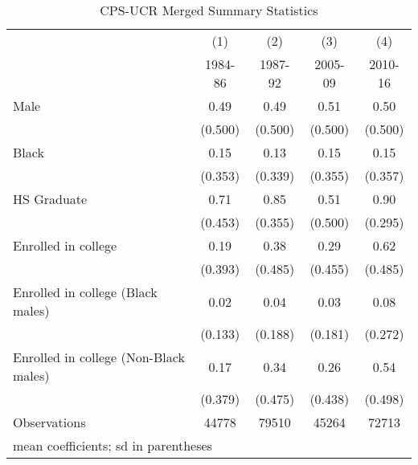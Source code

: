 \begin{table}[htbp]\centering
\caption{CPS-UCR Merged Summary Statistics}
\begin{tabular}{l*{4}{c}}
\hline\hline
                    &\multicolumn{1}{c}{(1)}&\multicolumn{1}{c}{(2)}&\multicolumn{1}{c}{(3)}&\multicolumn{1}{c}{(4)}\\
                    &\multicolumn{1}{c}{1984-86}&\multicolumn{1}{c}{1987-92}&\multicolumn{1}{c}{2005-09}&\multicolumn{1}{c}{2010-16}\\
\hline
Male                &        0.49&        0.49&        0.51&        0.50\\
                    &     (0.500)&     (0.500)&     (0.500)&     (0.500)\\
[1em]
Black               &        0.15&        0.13&        0.15&        0.15\\
                    &     (0.353)&     (0.339)&     (0.355)&     (0.357)\\
[1em]
HS Graduate         &        0.71&        0.85&        0.51&        0.90\\
                    &     (0.453)&     (0.355)&     (0.500)&     (0.295)\\
[1em]
Enrolled in college &        0.19&        0.38&        0.29&        0.62\\
                    &     (0.393)&     (0.485)&     (0.455)&     (0.485)\\
[1em]
Enrolled in college (Black males)&        0.02&        0.04&        0.03&        0.08\\
                    &     (0.133)&     (0.188)&     (0.181)&     (0.272)\\
[1em]
Enrolled in college (Non-Black males)&        0.17&        0.34&        0.26&        0.54\\
                    &     (0.379)&     (0.475)&     (0.438)&     (0.498)\\
\hline
Observations        &       44778&       79510&       45264&       72713\\
\hline\hline
\multicolumn{5}{l}{\footnotesize mean coefficients; sd in parentheses}\\
\end{tabular}
\end{table}

